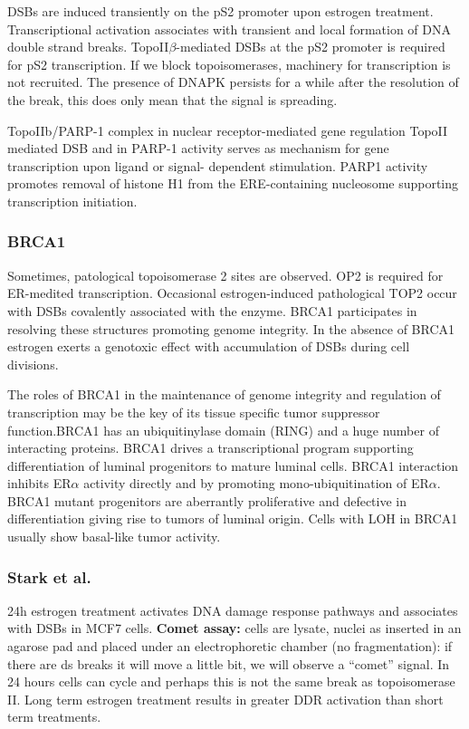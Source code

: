 DSBs are induced transiently on the pS2 promoter upon estrogen treatment. Transcriptional activation associates with transient and local formation of DNA double strand breaks. TopoII$\beta$-mediated DSBs at the pS2 promoter is required for pS2 transcription. If we block topoisomerases, machinery for transcription is not recruited. The presence of DNAPK persists for a while after the resolution of the break, this does only mean that the signal is spreading.

TopoIIb/PARP-1 complex in nuclear receptor-mediated gene regulation TopoII mediated DSB and in PARP-1 activity serves as mechanism for gene transcription upon ligand or signal- dependent stimulation. PARP1 activity promotes removal of histone H1 from the ERE-containing nucleosome supporting transcription initiation.

\hypertarget{brca1}{%
\subsubsection{BRCA1}\label{brca1}}

Sometimes, patological topoisomerase 2 sites are observed. OP2 is required for ER-medited transcription. Occasional estrogen-induced pathological TOP2 occur with DSBs covalently associated with the enzyme. BRCA1 participates in resolving these structures promoting genome integrity. In the absence of BRCA1 estrogen exerts a genotoxic effect with accumulation of DSBs during cell divisions.

The roles of BRCA1 in the maintenance of genome integrity and regulation of transcription may be the key of its tissue specific tumor suppressor function.BRCA1 has an ubiquitinylase domain (RING) and a huge number of interacting proteins. BRCA1 drives a transcriptional program supporting differentiation of luminal progenitors to mature luminal cells. BRCA1 interaction inhibits ER$\alpha$ activity directly and by promoting mono-ubiquitination of ER$\alpha$. BRCA1 mutant progenitors are aberrantly proliferative and defective in differentiation giving rise to tumors of luminal origin. Cells with LOH in BRCA1 usually show basal-like tumor activity.

\hypertarget{stark-et-al.}{%
\subsubsection{Stark et al.}\label{stark-et-al.}}

24h estrogen treatment activates DNA damage response pathways and associates with DSBs in MCF7 cells. \textbf{Comet assay:} cells are lysate, nuclei as inserted in an agarose pad and placed under an electrophoretic chamber (no fragmentation): if there are ds breaks it will move a little bit, we will observe a ``comet'' signal. In 24 hours cells can cycle and perhaps this is not the same break as topoisomerase II. Long term estrogen treatment results in greater DDR activation than short term treatments.

